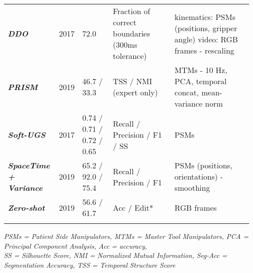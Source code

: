 \documentclass[journal]{IEEEtran}
\begin{document}
\begin{table*}[t]
\begin{threeparttable}
\begin{tabular}{m{1.8cm}|P{0.6cm}|m{2.8cm}|m{3cm}|m{7.1cm}}
    		 \textbf{\textit{DDO}} \scriptsize \cite{Fox2017} & 2017 &  72.0 &  Fraction of correct boundaries (300ms tolerance) &  kinematics: PSMs (positions, gripper angle) \newline video: RGB frames - rescaling\\ 
    		 \textbf{\textit{PRISM}} \scriptsize \cite{Goel2019} & 2019 & 46.7 / 33.3 & TSS / NMI (expert only)  &  MTMs - 10 Hz, PCA, temporal concat, mean-variance norm \\
    		 \textbf{\textit{Soft-UGS}} \scriptsize \cite{Fard2017} & 2017  & 0.74 / 0.71 / 0.72 / 0.65 & Recall / Precision / F1 / SS  &  PSMs\\
    		 \textbf{\textit{SpaceTime + \newline Variance}} \scriptsize \cite{Tsai2019unsup} & 2019 &  65.2 / 92.0 / 75.4& Recall / Precision / F1 &  PSMs (positions, orientations) - smoothing\\
    		 \textbf{\textit{Zero-shot}} \scriptsize \cite{Jones2019} & 2019 &  56.6 / 61.7 & Acc / Edit* &  RGB frames\\
    		
    	\end{tabular}
        \vspace{0.15 cm}
        	
        	\begin{tablenotes}
              \small
              \item \textit{PSMs = Patient Side Manipulators, MTMs = Master Tool Manipulators, PCA = Principal Component Analysis, Acc = accuracy, \\ SS = Silhouette Score, NMI = Normalized Mutual Information, Seg-Acc = Segmentation Accuracy, TSS = Temporal Structure Score}
            \end{tablenotes}
            
        \end{threeparttable}
    
	\label{table:ResultsUnsup}
\end{table*}
\end{document}
